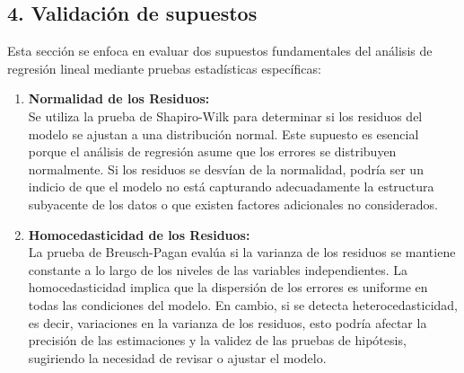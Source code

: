 \documentclass[
]{article}
\begin{document}
\subsection{\texorpdfstring{\textbf{4. Validación de
supuestos}}{4. Validación de supuestos}}\label{validaciuxf3n-de-supuestos}

Esta sección se enfoca en evaluar dos supuestos fundamentales del
análisis de regresión lineal mediante pruebas estadísticas específicas:

\begin{enumerate}
\def\labelenumi{\arabic{enumi}.}
\item
  \textbf{Normalidad de los Residuos:}\\
  Se utiliza la prueba de Shapiro-Wilk para determinar si los residuos
  del modelo se ajustan a una distribución normal. Este supuesto es
  esencial porque el análisis de regresión asume que los errores se
  distribuyen normalmente. Si los residuos se desvían de la normalidad,
  podría ser un indicio de que el modelo no está capturando
  adecuadamente la estructura subyacente de los datos o que existen
  factores adicionales no considerados.
\item
  \textbf{Homocedasticidad de los Residuos:}\\
  La prueba de Breusch-Pagan evalúa si la varianza de los residuos se
  mantiene constante a lo largo de los niveles de las variables
  independientes. La homocedasticidad implica que la dispersión de los
  errores es uniforme en todas las condiciones del modelo. En cambio, si
  se detecta heterocedasticidad, es decir, variaciones en la varianza de
  los residuos, esto podría afectar la precisión de las estimaciones y
  la validez de las pruebas de hipótesis, sugiriendo la necesidad de
  revisar o ajustar el modelo.
\end{enumerate}
\end{document}
